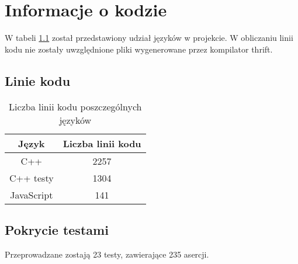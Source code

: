 \chapter{Informacje o kodzie}
W tabeli \ref{table:linie_kodu} został przedstawiony udział języków w projekcie. W obliczaniu linii kodu nie zostały uwzględnione pliki wygenerowane przez kompilator thrift.
\section{Linie kodu}
\begin{table}[h]
\begin{tabular}{|c|c|}
\hline
Język & Liczba linii kodu \\ \hline
C++ & 2257 \\ \hline
C++ testy &  1304 \\ \hline
JavaScript & 141 \\ \hline
\end{tabular}
\caption{Liczba linii kodu poszczególnych języków}
\label{table:linie_kodu}
\end{table}

\section{Pokrycie testami}
Przeprowadzane zostają 23 testy, zawierające 235 asercji.